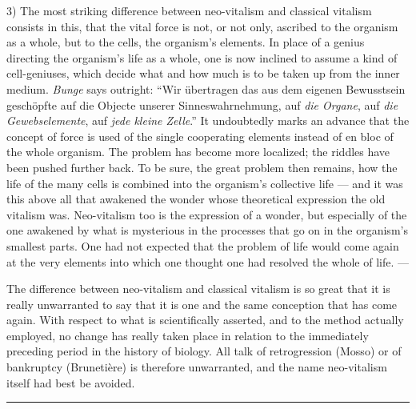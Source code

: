 \documentclass[12pt,a4paper,openany]{book}
\newcommand{\opage}[1]{\marginnote{\footnotesize\textit{[#1]}}}
\newcommand{\streg}{\begin{center}\rule{3em}{0.4pt}\end{center}}
\begin{document}
3) The most striking difference between neo-vitalism and classical vitalism
consists in this, that the vital force is not, or not only, ascribed to the
organism as a whole, but to the cells, the organism's elements. In place of a
genius directing the organism's life as a whole, one is now inclined to assume a
kind of cell-geniuses, which decide what and how much is to be taken up from the
inner medium. \emph{Bunge} says outright: ``Wir übertragen das aus dem
eigenen Bewusstsein geschöpfte auf die Objecte unserer Sinneswahrnehmung, auf \emph{die
Organe}, auf \emph{die Gewebselemente}, auf \emph{jede kleine Zelle}.'' It
undoubtedly marks an advance that the
\opage{48}concept of force is used of the single cooperating elements instead of
en bloc of the whole organism. The problem has become more localized; the
riddles have been pushed further back. To be sure, the great problem then
remains, how the life of the many cells is combined into the organism's
collective life --- and it was this above all that awakened the wonder whose
theoretical expression the old vitalism was. Neo-vitalism too is the expression
of a wonder, but especially of the one awakened by what is mysterious in the
processes that go on in the organism's smallest parts. One had not expected that
the problem of life would come again at the very elements into which one thought
one had resolved the whole of life. ---

The difference between neo-vitalism and classical vitalism is so great that it
is really unwarranted to say that it is one and the same conception that has
come again. With respect to what is scientifically asserted, and to the method
actually employed, no change has really taken place in relation to the
immediately preceding period in the history of biology. All talk of retrogression
(Mosso) or of bankruptcy (Brunetière) is therefore unwarranted, and the name
neo-vitalism itself had best be avoided.

\streg{}
\end{document}
